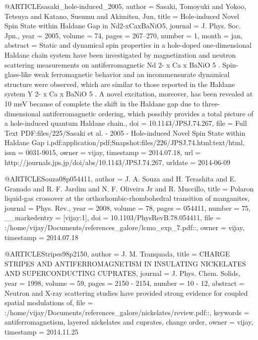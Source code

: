 @ARTICLE{sasaki_hole-induced_2005,
  author = {Sasaki, Tomoyuki and Yokoo, Tetsuya and Katano, Susumu and Akimitsu,
	Jun},
  title = {Hole-induced Novel Spin State within Haldane Gap in Nd2-{xCaxBaNiO}5},
  journal = {J. Phys. Soc. Jpn.},
  year = {2005},
  volume = {74},
  pages = {267--270},
  number = {1},
  month = jan,
  abstract = {Static and dynamical spin properties in a hole-doped one-dimensional
	Haldane chain system have been investigated by magnetization and
	neutron scattering measurements on antiferromagnetic Nd 2- x Ca x
	{BaNiO} 5 . Spin-glass-like weak ferromagnetic behavior and an incommensurate
	dynamical structure were observed, which are similar to those reported
	in the Haldane system Y 2- x Ca x {BaNiO} 5 . A novel excitation,
	moreover, has been revealed at 10 {meV} because of complete the shift
	in the Haldane gap due to three-dimensional antiferromagnetic ordering,
	which possibly provides a total picture of a hole-induced quantum
	Haldane chain.},
  doi = {10.1143/JPSJ.74.267},
  file = {Full Text PDF:files/225/Sasaki et al. - 2005 - Hole-induced Novel Spin State within Haldane Gap i.pdf:application/pdf;Snapshot:files/226/JPSJ.74.html:text/html},
  issn = {0031-9015},
  owner = {vijay},
  timestamp = {2014.07.18},
  url = {http://journals.jps.jp/doi/abs/10.1143/JPSJ.74.267},
  urldate = {2014-06-09}
}

@ARTICLE{Souza08p054411,
  author = {J. A. Souza and H. Terashita and E. Granado and R. F. Jardim and
	N. F. Oliveira Jr and R. Muccillo},
  title = {Polaron liquid-gas crossover at the orthorhombic-rhombohedral transition
	of manganites},
  journal = {Phys. Rev.},
  year = {2008},
  volume = {78},
  pages = {054411},
  number = {75},
  __markedentry = {[vijay:1]},
  doi = {10.1103/PhysRevB.78.054411},
  file = {:/home/vijay/Documents/references_galore/lcmo_exp_7.pdf::},
  owner = {vijay},
  timestamp = {2014.07.18}
}

@ARTICLE{Stripes98p2150,
  author = {J. M. Tranquada},
  title = {CHARGE STRIPES AND ANTIFERROMAGNETISM IN INSULATING NICKELATES AND
	SUPERCONDUCTING CUPRATES},
  journal = {J. Phys. Chem. Solids},
  year = {1998},
  volume = {59},
  pages = {2150 - 2154},
  number = {10 - 12},
  abstract = {Neutron and X-ray scattering studies have provided strong evidence
	for coupled spatial modulations of},
  file = {:/home/vijay/Documents/references_galore/nickelates/review.pdf::},
  keywords = {antiferromagnetism, layered nickelates and cuprates, change order},
  owner = {vijay},
  timestamp = {2014.11.25}
}

